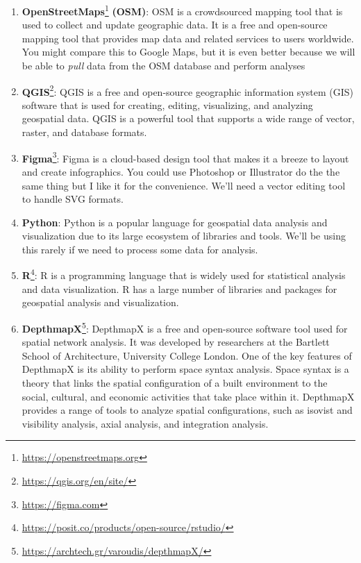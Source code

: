 \documentclass[
]{latex/krantz}
\renewcommand{\href}[2]{#2\footnote{\url{#1}}}
\DeclareRobustCommand{\href}[2]{#2\footnote{\url{#1}}}
\begin{document}
\begin{enumerate}
\def\labelenumi{\arabic{enumi}.}
\item
  \href{https://openstreetmaps.org}{\textbf{OpenStreetMaps}} \textbf{(OSM)}: OSM is a crowdsourced mapping tool that is used to collect and update geographic data. It is a free and open-source mapping tool that provides map data and related services to users worldwide. You might compare this to Google Maps, but it is even better because we will be able to \emph{pull} data from the OSM database and perform analyses
\item
  \href{https://qgis.org/en/site/}{\textbf{QGIS}}: QGIS is a free and open-source geographic information system (GIS) software that is used for creating, editing, visualizing, and analyzing geospatial data. QGIS is a powerful tool that supports a wide range of vector, raster, and database formats.
\item
  \href{https://figma.com}{\textbf{Figma}}: Figma is a cloud-based design tool that makes it a breeze to layout and create infographics. You could use Photoshop or Illustrator do the the same thing but I like it for the convenience. We'll need a vector editing tool to handle SVG formats.
\item
  \textbf{Python}: Python is a popular language for geospatial data analysis and visualization due to its large ecosystem of libraries and tools. We'll be using this rarely if we need to process some data for analysis.
\item
  \href{https://posit.co/products/open-source/rstudio/}{\textbf{R}}: R is a programming language that is widely used for statistical analysis and data visualization. R has a large number of libraries and packages for geospatial analysis and visualization.
\item
  \href{https://archtech.gr/varoudis/depthmapX/}{\textbf{DepthmapX}}: DepthmapX is a free and open-source software tool used for spatial network analysis. It was developed by researchers at the Bartlett School of Architecture, University College London. One of the key features of DepthmapX is its ability to perform space syntax analysis. Space syntax is a theory that links the spatial configuration of a built environment to the social, cultural, and economic activities that take place within it. DepthmapX provides a range of tools to analyze spatial configurations, such as isovist and visibility analysis, axial analysis, and integration analysis.
\end{enumerate}
\end{document}
